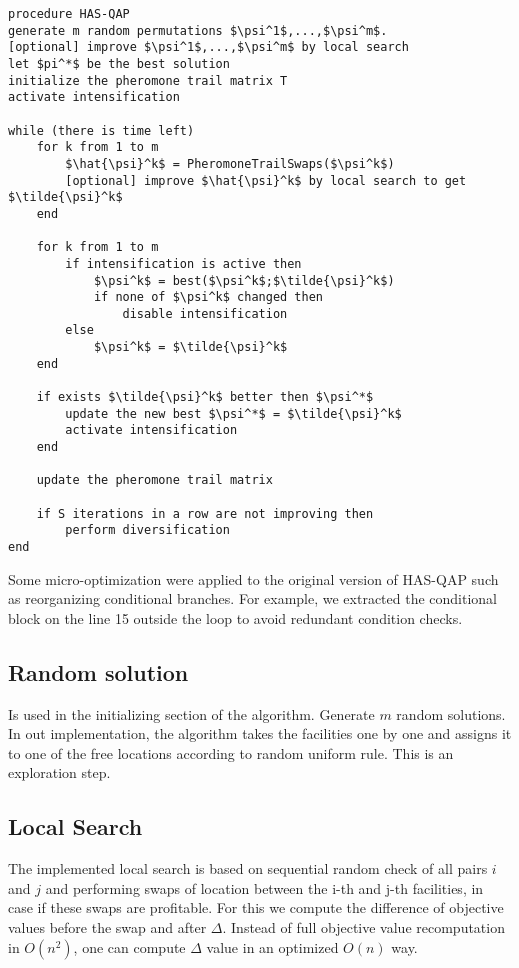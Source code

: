 \documentclass[12pt]{article}
\begin{document}
\begin{minipage}[c]{0.95\textwidth}
\begin{lstlisting}[caption={HAS-QAP pseudo-code}, label={lst:has-qap},mathescape]
procedure HAS-QAP
generate m random permutations $\psi^1$,...,$\psi^m$.
[optional] improve $\psi^1$,...,$\psi^m$ by local search
let $pi^*$ be the best solution
initialize the pheromone trail matrix T
activate intensification

while (there is time left)
	for k from 1 to m
		$\hat{\psi}^k$ = PheromoneTrailSwaps($\psi^k$)
		[optional] improve $\hat{\psi}^k$ by local search to get $\tilde{\psi}^k$
	end
	
	for k from 1 to m
		if intensification is active then
			$\psi^k$ = best($\psi^k$;$\tilde{\psi}^k$)		
			if none of $\psi^k$ changed then
				disable intensification
		else
			$\psi^k$ = $\tilde{\psi}^k$
	end
	
	if exists $\tilde{\psi}^k$ better then $\psi^*$
		update the new best $\psi^*$ = $\tilde{\psi}^k$
		activate intensification
	end
	
	update the pheromone trail matrix
	
	if S iterations in a row are not improving then
		perform diversification
end
\end{lstlisting}
\end{minipage}


Some micro-optimization were applied to the original version of HAS-QAP such as reorganizing conditional branches. For example, we extracted the conditional block on the line 15 outside the loop to avoid redundant condition checks.

\subsection{Random solution}
Is used in the initializing section of the algorithm. Generate $m$ random solutions. In out implementation, the algorithm takes the facilities one by one and assigns it to one of the free locations according to random uniform rule. This is an exploration step.

\subsection{Local Search}

The implemented local search is based on sequential random check of all pairs $i$ and $j$ and performing swaps of location between the i-th and j-th facilities, in case if these swaps are profitable. For this we compute the difference of objective values before the swap and after $\Delta$. Instead of full objective value recomputation in $O(n^2)$, one can compute $\Delta$ value in an optimized $O(n)$ way.
\end{document}
